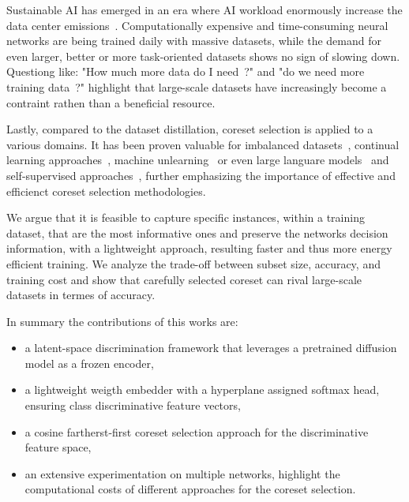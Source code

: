 

Sustainable AI has emerged in an era where AI workload enormously increase the data center emissions~\cite{jha-etal:2025}. 
Computationally expensive and time-consuming neural networks are being trained daily with massive datasets, while the demand for even larger, better or more task-oriented datasets shows no sign of slowing down.
Questiong like: "How much more data do I need~\cite{mahmood-etal:2022}?" and "do we need more training data~\cite{zhu-vondrick-etal:2016}?" highlight that large-scale datasets have increasingly become a contraint rathen than a beneficial resource. 


Lastly, compared to the dataset distillation, coreset selection is applied to a 
various domains.
It has been proven valuable for imbalanced datasets~\cite{sivasubramanian-aagalapatti-etal:2024,luo-zhao-etal:2024}, continual learning approaches~\cite{titsias-schwarz-etal:2019,mirzadeh-farajtabar-etal:2020}, 
machine unlearning~\cite{bourtoule-chandrasekaran-etal:2021} or even large languare models~\cite{killamsetty-zhao-etal:2021} and self-supervised approaches~\cite{kim-bae-yun:2023,singh-vashishtha-etal:2025}, further emphasizing the importance of effective and efficienct coreset selection methodologies.


We argue that it is feasible to capture specific instances, within a training dataset, that are the most informative ones and preserve the networks decision information, with a lightweight approach, resulting faster and thus more energy efficient training.
We analyze the trade-off between subset size, accuracy, and training cost and show that carefully selected coreset can rival large-scale datasets in termes of accuracy. 


In summary the contributions of this works are:
\begin{itemize}
	\item a latent-space discrimination framework that leverages a pretrained diffusion model as a frozen encoder,
	\item a lightweight weigth embedder with a hyperplane assigned softmax head, ensuring class discriminative feature vectors,
	\item a cosine fartherst-first coreset selection approach for the discriminative feature space,
	\item an extensive experimentation on multiple networks, highlight the computational costs of different approaches for the coreset selection.
\end{itemize}



